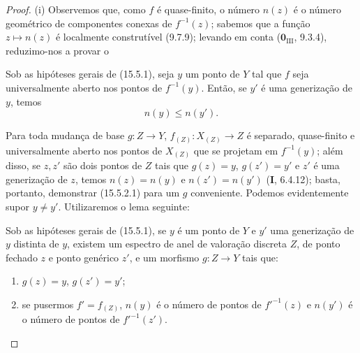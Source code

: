 \begin{proof}
(i) Observemos que, como $f$ é quase-finito, o número $n(z)$ é o número geométrico de componentes conexas de $f^{-1}(z)$; sabemos que a função $z\mapsto n(z)$ é localmente construtível (9.7.9); levando em conta ($\mathbf{0}_{\mathrm{III}}$, 9.3.4), reduzimo-nos a provar o

\begin{corollary}[15.5.2]
\label{IV.15.5.2}
Sob as hipóteses gerais de (15.5.1), seja $y$ um ponto de $Y$ tal que $f$ seja universalmente aberto nos pontos de $f^{-1}(y)$. Então, se $y'$ é uma generização de $y$, temos
\begin{equation}
\tag{15.5.2.1}
\label{IV.15.5.2.1}
  n(y)\leqslant n(y').
\end{equation}
\end{corollary}

Para toda mudança de base $g:Z\to Y$, $f_{(Z)}:X_{(Z)}\to Z$ é separado, quase-finito e universalmente aberto nos pontos de $X_{(Z)}$ que se projetam em $f^{-1}(y)$; além disso, se $z,z'$ são dois pontos de $Z$ tais que $g(z)=y$, $g(z')=y'$ e $z'$ é uma generização de $z$, temos $n(z)=n(y)$ e $n(z')=n(y')$ (\textbf{I}, 6.4.12); basta, portanto, demonstrar (15.5.2.1) para um $g$ conveniente. Podemos evidentemente supor $y\ne y'$. Utilizaremos o lema seguinte:

\begin{lemma}[15.5.2.2]
\label{IV.15.5.2.2}
Sob as hipóteses gerais de (15.5.1), se $y$ é um ponto de $Y$ e $y'$ uma generização de $y$ distinta de $y$, existem um espectro de anel de valoração discreta $Z$, de ponto fechado $z$ e ponto genérico $z'$, e um morfismo $g:Z\to Y$ tais que:
\begin{enumerate}[label=\emph{\arabic*\textsuperscript{\textdegree}}]
  \item $g(z)=y$, $g(z')=y'$;
  \item se pusermos $f'=f_{(Z)}$, $n(y)$ é o número de pontos de $f'^{-1}(z)$ e $n(y')$ é o número de pontos de $f'^{-1}(z')$.
\end{enumerate}
\end{lemma}


\end{proof}
